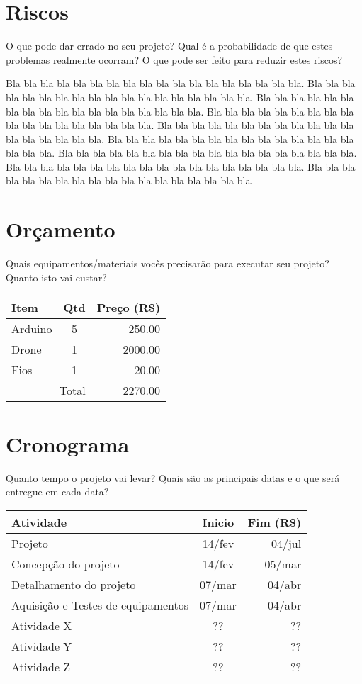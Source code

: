 \documentclass{acm_proc_article-sp}
\begin{document}
\section{Riscos}

O que pode dar errado no seu projeto?
Qual é a probabilidade de que estes problemas realmente ocorram?
O que pode ser feito para reduzir estes riscos?

Bla bla bla bla bla bla bla bla bla bla bla bla bla bla bla bla bla bla.
Bla bla bla bla bla bla bla bla bla bla bla bla bla bla bla bla bla bla.
Bla bla bla bla bla bla bla bla bla bla bla bla bla bla bla bla bla bla.
Bla bla bla bla bla bla bla bla bla bla bla bla bla bla bla bla bla bla.
Bla bla bla bla bla bla bla bla bla bla bla bla bla bla bla bla bla bla.
Bla bla bla bla bla bla bla bla bla bla bla bla bla bla bla bla bla bla.
Bla bla bla bla bla bla bla bla bla bla bla bla bla bla bla bla bla bla.
Bla bla bla bla bla bla bla bla bla bla bla bla bla bla bla bla bla bla.
Bla bla bla bla bla bla bla bla bla bla bla bla bla bla bla bla bla bla.

\section{Orçamento}

Quais equipamentos/materiais vocês precisarão para executar seu projeto?
Quanto isto vai custar?

\begin{table}[h!]
\centering
\begin{tabular}{l|c|r}
Item & Qtd & Preço (R\$) \\
\hline
Arduino & 5 & 250.00 \\
Drone   & 1 & 2000.00 \\
Fios    & 1 & 20.00 \\
\hline
\multicolumn{2}{r}{Total} & 2270.00
\end{tabular}
\label{tab:my_label}
\end{table}


\section{Cronograma}

Quanto tempo o projeto vai levar?
Quais são as principais datas e o que será entregue em cada data?

\begin{table}[h!]
\centering
\begin{tabular}{l|c|r}
Atividade & Inicio & Fim (R\$) \\
\hline
Projeto & 14/fev & 04/jul \\
\hline
Concepção do projeto & 14/fev & 05/mar \\
Detalhamento do projeto & 07/mar & 04/abr \\
Aquisição e Testes de equipamentos & 07/mar & 04/abr \\
Atividade X & ?? & ?? \\
Atividade Y & ?? & ?? \\
Atividade Z & ?? & ?? \\
\end{tabular}
\label{tab:my_label}
\end{table}
\end{document}
